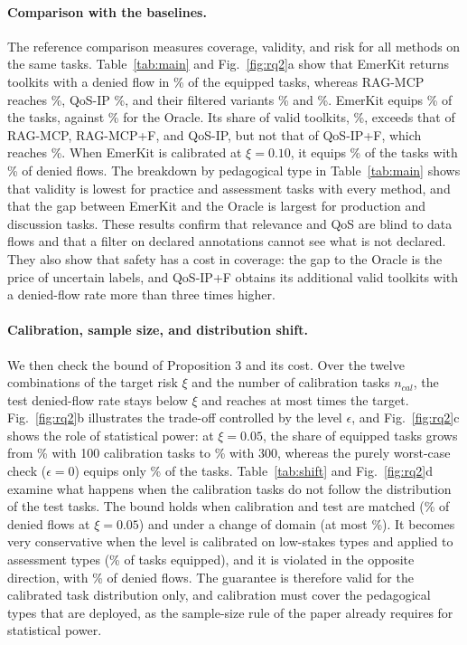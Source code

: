\documentclass[10pt]{article}
\newcommand{\sysname}{EmerKit}
\begin{document}
\paragraph{Comparison with the baselines.} The reference comparison measures coverage, validity, and risk for all methods on the same tasks. Table~\ref{tab:main} and Fig.~\ref{fig:rq2}a show that \sysname{} returns toolkits with a denied flow in \RAEmerkitDfr\% of the equipped tasks, whereas RAG-MCP reaches \RARagMcpDfr\%, QoS-IP \RAZengDfr\%, and their filtered variants \RARagMcpPlusFilterDfr\% and \RAZengPlusFilterDfr\%. \sysname{} equips \RAEmerkitEq\% of the tasks, against \RAOracleEq\% for the Oracle. Its share of valid toolkits, \RAEmerkitValid\%, exceeds that of RAG-MCP, RAG-MCP+F, and QoS-IP, but not that of QoS-IP+F, which reaches \RAZengPlusFilterValid\%. When \sysname{} is calibrated at $\xi=0.10$, it equips \RAEmerkitXiEq\% of the tasks with \RAEmerkitXiDfr\% of denied flows. The breakdown by pedagogical type in Table~\ref{tab:main} shows that validity is lowest for practice and assessment tasks with every method, and that the gap between \sysname{} and the Oracle is largest for production and discussion tasks. These results confirm that relevance and QoS are blind to data flows and that a filter on declared annotations cannot see what is not declared. They also show that safety has a cost in coverage: the gap to the Oracle is the price of uncertain labels, and QoS-IP+F obtains its additional valid toolkits with a denied-flow rate more than three times higher.

\paragraph{Calibration, sample size, and distribution shift.} We then check the bound of Proposition 3 and its cost. Over the twelve combinations of the target risk $\xi$ and the number of calibration tasks $n_{cal}$, the test denied-flow rate stays below $\xi$ and reaches at most \RBMaxDfrRatio{} times the target. Fig.~\ref{fig:rq2}b illustrates the trade-off controlled by the level $\epsilon$, and Fig.~\ref{fig:rq2}c shows the role of statistical power: at $\xi=0.05$, the share of equipped tasks grows from \RBEqHundred\% with 100 calibration tasks to \RBEqThree\% with 300, whereas the purely worst-case check ($\epsilon=0$) equips only \RBEqEpsZero\% of the tasks. Table~\ref{tab:shift} and Fig.~\ref{fig:rq2}d examine what happens when the calibration tasks do not follow the distribution of the test tasks. The bound holds when calibration and test are matched (\RXsixMatchDfr\% of denied flows at $\xi=0.05$) and under a change of domain (at most \RXsixDomMax\%). It becomes very conservative when the level is calibrated on low-stakes types and applied to assessment types (\RXsixLowEq\% of tasks equipped), and it is violated in the opposite direction, with \RXsixAssessDfr\% of denied flows. The guarantee is therefore valid for the calibrated task distribution only, and calibration must cover the pedagogical types that are deployed, as the sample-size rule of the paper already requires for statistical power.
\end{document}
